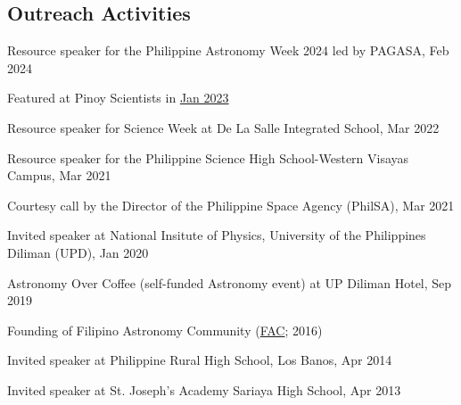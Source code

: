\documentclass[11pt,letterpaper]{article}
\begin{document}
\subsection{Outreach Activities}
\begin{list}{}{\cvlist}
    \item Resource speaker for the Philippine Astronomy Week 2024 led by PAGASA, Feb 2024
    \item Featured at Pinoy Scientists in \href{https://www.facebook.com/pinoyscientists/posts/pfbid0Lj83pJZaaU35tdSpz5UKgkAodhBqMzudUjCS7z4UV32zqiqmkQzT7LdtpGTsu7Cql}{Jan 2023}
    \item Resource speaker for Science Week at De La Salle Integrated School, Mar 2022
    \item Resource speaker for the Philippine Science High School-Western Visayas Campus, Mar 2021
    \item Courtesy call by the Director of the Philippine Space Agency (PhilSA), Mar 2021
    \item Invited speaker at National Insitute of Physics, University of the Philippines Diliman (UPD), Jan 2020
    \item Astronomy Over Coffee (self-funded Astronomy event) at UP Diliman Hotel, Sep 2019
    \item Founding of Filipino Astronomy Community (\href{https://www.facebook.com/groups/filastrocomm}{FAC}; 2016)
    \item Invited speaker at Philippine Rural High School, Los Banos, Apr 2014
    \item Invited speaker at St. Joseph's Academy Sariaya High School, Apr 2013
\end{list}
\end{document}
